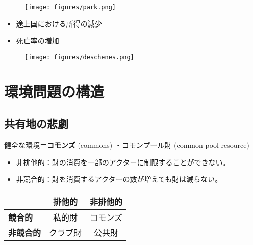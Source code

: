 \documentclass[
  xelatex,
  ja=standard]{bxjsarticle}
\providecommand{\tightlist}{%
  \setlength{\itemsep}{0pt}\setlength{\parskip}{0pt}}\usepackage{longtable,booktabs,array}
\begin{document}
\begin{figure}[htpb]

{\centering \texttt{[image: figures/park.png]}

}

\caption{\citet{park2020}}

\end{figure}

\begin{itemize}
\tightlist
\item
  途上国における所得の減少\citep{dell2014}
\item
  死亡率の増加\citep{deschenes2011}
\end{itemize}

\begin{figure}[htpb]

{\centering \texttt{[image: figures/deschenes.png]}

}

\caption{\citet{deschenes2011}}

\end{figure}

\hypertarget{ux74b0ux5883ux554fux984cux306eux69cbux9020}{%
\section{環境問題の構造}\label{ux74b0ux5883ux554fux984cux306eux69cbux9020}}

\hypertarget{ux5171ux6709ux5730ux306eux60b2ux5287}{%
\subsection{共有地の悲劇}\label{ux5171ux6709ux5730ux306eux60b2ux5287}}

健全な環境＝\textbf{コモンズ} (commons) ・コモンプール財 (common pool
resource)

\begin{itemize}
\tightlist
\item
  非排他的：財の消費を一部のアクターに制限することができない。
\item
  非競合的：財を消費するアクターの数が増えても財は減らない。
\end{itemize}

\begin{longtable}[]{@{}lcc@{}}
\toprule\noalign{}
& \textbf{排他的} & \textbf{非排他的} \\
\midrule\noalign{}
\endhead
\bottomrule\noalign{}
\endlastfoot
\textbf{競合的} & 私的財 & コモンズ \\
\textbf{非競合的} & クラブ財 & 公共財 \\
\end{longtable}
\end{document}
